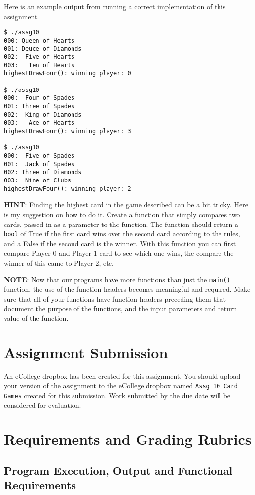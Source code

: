 \documentclass[11pt]{article}
\begin{document}
Here is an example output from running a correct implementation of
this assignment.

\begin{verbatim}
$ ./assg10 
000: Queen of Hearts
001: Deuce of Diamonds
002:  Five of Hearts
003:   Ten of Hearts
highestDrawFour(): winning player: 0

$ ./assg10 
000:  Four of Spades
001: Three of Spades
002:  King of Diamonds
003:   Ace of Hearts
highestDrawFour(): winning player: 3

$ ./assg10 
000:  Five of Spades
001:  Jack of Spades
002: Three of Diamonds
003:  Nine of Clubs
highestDrawFour(): winning player: 2
\end{verbatim}

\textbf{HINT}: Finding the highest card in the game described can be a bit
tricky.  Here is my suggestion on how to do it.  Create a function
that simply compares two cards, passed in as a parameter to the
function.  The function should return a \verb~bool~ of True if the first card
wins over the second card according to the rules, and a False if the
second card is the winner.  With this function you can first compare
Player 0 and Player 1 card to see which one wins, the compare the
winner of this came to Player 2, etc.

\textbf{NOTE}: Now that our programs have more functions than just the
\verb~main()~ function, the use of the function headers becomes meaningful
and required.  Make sure that all of your functions have function
headers preceding them that document the purpose of the functions, and
the input parameters and return value of the function.
\section*{Assignment Submission}
\label{sec-4}

An eCollege dropbox has been created for this assignment.  You should
upload your version of the assignment to the eCollege dropbox named
\verb~Assg 10 Card Games~ created for this submission.  Work
submitted by the due date will be considered for evaluation.
\section*{Requirements and Grading Rubrics}
\label{sec-5}

\subsection*{Program Execution, Output and Functional Requirements}
\label{sec-5-1}
\end{document}

